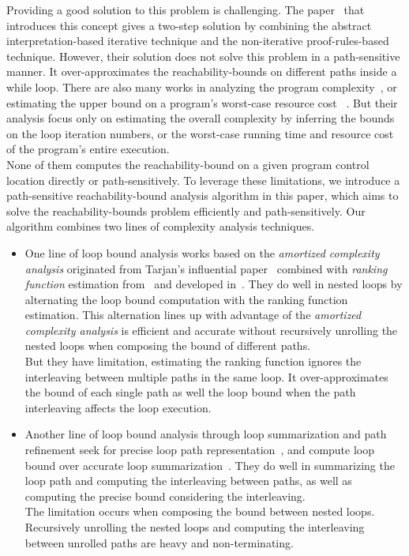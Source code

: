 Providing a good solution to this problem is challenging.
The paper~\cite{GulwaniZ10} that introduces this concept
gives a two-step solution by combining the abstract interpretation-based iterative technique
and the non-iterative proof-rules-based technique.
However, their solution
does not solve this problem in a path-sensitive manner.
It over-approximates the reachability-bounds on different paths inside a while loop.
There are also many works in analyzing the program complexity~\cite{GustafssonEL05, HumenbergerJK18},
or estimating the upper bound on a program's worst-case resource cost
~\cite{BrockschmidtEFFG16, AlbertAGP08, AliasDFG10, Flores-MontoyaH14}.
But their analysis
focus only on estimating 
the overall complexity 
by inferring the bounds on the loop iteration numbers,
or the worst-case running time and resource cost of the program's entire execution.
\\
None of them computes the reachability-bound on a given program control location directly or path-sensitively.
To leverage these limitations,
we introduce a path-sensitive reachability-bound analysis algorithm in this paper, which aims to solve 
the reachability-bounds problem efficiently and path-sensitively.
Our algorithm combines two lines of complexity analysis techniques.
\begin{itemize}
  \item One line of loop bound analysis works based on the \emph{amortized complexity analysis} originated from Tarjan's influential paper~\cite{PotechinP17} combined with \emph{ranking function} estimation from~\cite{BradleyMS05} and developed in~\cite{ZulegerGSV11,SinnZV14,SinnZV17,LuCT21,AliasDFG10}.
  They do well in nested loops by alternating the loop bound computation with the ranking function estimation. This alternation lines up with advantage of the \emph{amortized complexity analysis} is efficient and accurate without recursively unrolling the nested loops when composing the bound of different paths.
  \\
  But they have limitation, estimating the ranking function ignores the interleaving between multiple paths in the same loop.
  It over-approximates the bound of each single path as well the loop bound when the path interleaving affects the loop execution.
  \item 
  Another line of loop bound analysis through loop summarization and path refinement seek for precise loop path representation~\cite{ManoliosV06, BalakrishnanSIG09, SharmaDDA11, Flores-MontoyaH14, HumenbergerJK18, CyphertBKR19}, and compute loop bound over accurate loop summarization~\cite{GulwaniJK09, ZulegerGSV11}.
  They do well in summarizing the loop path and computing the interleaving between paths, as well as computing the precise bound considering the interleaving.
  \\
  The limitation occurs when composing the bound between nested loops. Recursively unrolling the nested loops and computing the interleaving between unrolled paths are heavy and non-terminating.
\end{itemize}

